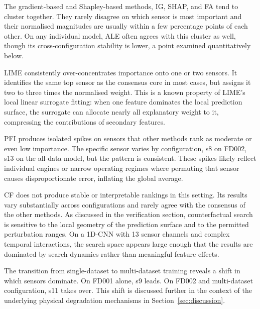 The gradient-based and Shapley-based methods, IG, SHAP, and FA tend to cluster together. They rarely disagree on which sensor is most important and their normalised magnitudes are usually within a few percentage points of each other. On any individual model, ALE often agrees with this cluster as well, though its cross-configuration stability is lower, a point examined quantitatively below.

LIME consistently over-concentrates importance onto one or two sensors. It identifies the same top sensor as the consensus core in most cases, but assigns it two to three times the normalised weight. This is a known property of LIME's local linear surrogate fitting: when one feature dominates the local prediction surface, the surrogate can allocate nearly all explanatory weight to it, compressing the contributions of secondary features.

PFI produces isolated spikes on sensors that other methods rank as moderate or even low importance. The specific sensor varies by configuration, s8 on FD002, s13 on the all-data model, but the pattern is consistent. These spikes likely reflect individual engines or narrow operating regimes where permuting that sensor causes disproportionate error, inflating the global average.

CF does not produce stable or interpretable rankings in this setting. Its results vary substantially across configurations and rarely agree with the consensus of the other methods. As discussed in the verification section, counterfactual search is sensitive to the local geometry of the prediction surface and to the permitted perturbation ranges. On a 1D-CNN with 13 sensor channels and complex temporal interactions, the search space appears large enough that the results are dominated by search dynamics rather than meaningful feature effects.

The transition from single-dataset to multi-dataset training reveals a shift in which sensors dominate. On FD001 alone, s9 leads. On FD002 and multi-dataset configuration, s11 takes over. This shift is discussed further in the context of the underlying physical degradation mechanisms in Section~\ref{sec:discussion}.

